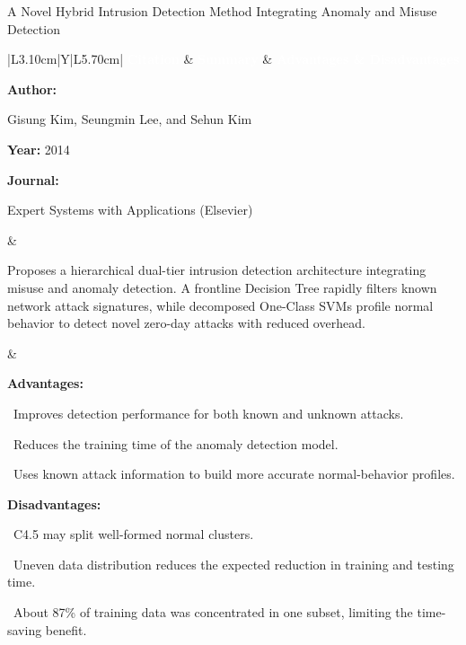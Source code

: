 \documentclass[aspectratio=169,10pt]{beamer}
\newcommand{\lrhdr}{%
  \rowcolor{prismNavy}%
  {\scriptsize\textcolor{white}{\textbf{Citation}}} &
  {\scriptsize\textcolor{white}{\textbf{Summary}}} &
  {\scriptsize\textcolor{white}{\textbf{Advantages \& Disadvantages}}} \\}
\begin{document}
\begin{frame}[t]{A Novel Hybrid Intrusion Detection Method Integrating Anomaly and Misuse Detection}
\vspace{-0.30em}
{\footnotesize\setlength{\tabcolsep}{3.5pt}\renewcommand{\arraystretch}{1.10}
\begin{tabularx}{\textwidth}{|L{3.10cm}|Y|L{5.70cm}|}
\hline\lrhdr\hline
\begin{minipage}[t]{\linewidth}\fontsize{7.2pt}{9.2pt}\raggedright\selectfont
\textbf{Author:}\par
Gisung Kim, Seungmin Lee, and Sehun Kim\par\vspace{4pt}
\textbf{Year:} 2014\par\vspace{4pt}
\textbf{Journal:}\par
Expert Systems with Applications (Elsevier)\par\vspace{4pt}
\end{minipage}
&
\begin{minipage}[t]{\linewidth}\fontsize{7.2pt}{9.2pt}\raggedright\selectfont
Proposes a hierarchical dual-tier intrusion detection architecture integrating misuse and anomaly detection. A frontline Decision Tree rapidly filters known network attack signatures, while decomposed One-Class SVMs profile normal behavior to detect novel zero-day attacks with reduced overhead.\par\vspace{4pt}
\end{minipage}
&
\begin{minipage}[t]{\linewidth}\fontsize{6.8pt}{8.4pt}\raggedright\selectfont
\textcolor{strengthGreen}{\textbf{Advantages:}}\par\vspace{1.3pt}
\textbullet~Improves detection performance for both known and unknown attacks.\par\vspace{1.8pt}\textbullet~Reduces the training time of the anomaly detection model.\par\vspace{1.8pt}\textbullet~Uses known attack information to build more accurate normal-behavior profiles.\par\vspace{3.2pt}
\textcolor{limitRed}{\textbf{Disadvantages:}}\par\vspace{1.3pt}
\textbullet~C4.5 may split well-formed normal clusters.\par\vspace{1.8pt}\textbullet~Uneven data distribution reduces the expected reduction in training and testing time.\par\vspace{1.8pt}\textbullet~About 87\% of training data was concentrated in one subset, limiting the time-saving benefit.\par\vspace{3pt}
\end{minipage} \\\hline
\end{tabularx}}
\end{frame}
\end{document}
